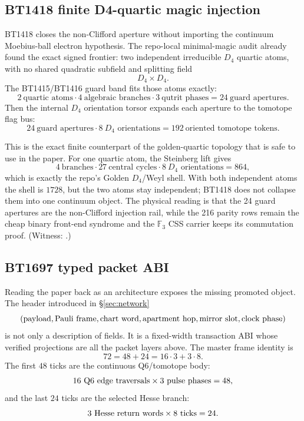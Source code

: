 \documentclass[11pt]{article}
\begin{document}
\subsection{BT1418 finite D4-quartic magic injection}

BT1418 closes the non-Clifford aperture without importing the continuum
Moebius-ball electron hypothesis.  The repo-local minimal-magic audit already
found the exact signed frontier: two independent irreducible \(D_4\) quartic
atoms, with no shared quadratic subfield and splitting field
\[
  D_4\times D_4.
\]
The BT1415/BT1416 guard band fits those atoms exactly:
\[
  2\ \text{quartic atoms}\cdot
  4\ \text{algebraic branches}\cdot
  3\ \text{qutrit phases}
  =24\ \text{guard apertures}.
\]
Then the internal \(D_4\) orientation torsor expands each aperture to the
tomotope flag bus:
\[
  24\ \text{guard apertures}\cdot8\ \text{\(D_4\) orientations}
  =192\ \text{oriented tomotope tokens}.
\]

This is the exact finite counterpart of the golden-quartic topology that is
safe to use in the paper.  For one quartic atom, the Steinberg lift gives
\[
  4\ \text{branches}\cdot27\ \text{central cycles}\cdot8\ \text{\(D_4\) orientations}
  =864,
\]
which is exactly the repo's Golden \(D_4\)/Weyl shell.  With both independent
atoms the shell is \(1728\), but the two atoms stay independent; BT1418 does
not collapse them into one continuum object.  The physical reading is that the
24 guard apertures are the non-Clifford injection rail, while the 216 parity
rows remain the cheap binary front-end syndrome and the \(\mathbb F_3\) CSS
carrier keeps its commutation proof.  (Witness:
.)

\subsection{BT1697 typed packet ABI}

Reading the paper back as an architecture exposes the missing promoted object.
The header introduced in \S\ref{sec:network}
\[
  (\hbox{payload},\hbox{Pauli frame},\hbox{chart word},\hbox{apartment hop},
  \hbox{mirror slot},\hbox{clock phase})
\]
is not only a description of fields.  It is a fixed-width transaction ABI whose
verified projections are all the packet layers above.  The master frame identity is
\[
  72 = 48+24 = 16\cdot3 + 3\cdot8.
\]
The first \(48\) ticks are the continuous Q6/tomotope body:
\[
  16\ \hbox{Q6 edge traversals}\times
  3\ \hbox{pulse phases} = 48,
\]
and the last \(24\) ticks are the selected Hesse branch:
\[
  3\ \hbox{Hesse return words}\times 8\ \hbox{ticks}=24.
\]
\end{document}
